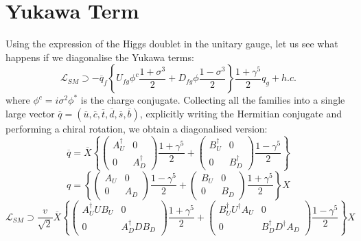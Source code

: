 \documentclass[11pt,a4paper,twoside,openright]{report}
\begin{document}
\section{Yukawa Term}
Using the expression of the Higgs doublet in the unitary gauge, let us see what happens if we diagonalise the Yukawa terms:
\begin{equation}
\mathcal{L}_{SM} \supset -\overline{q}_f \left\{ U_{fg}\phi^c\frac{1+\sigma^3}{2}+D_{fg}\phi\frac{1-\sigma^3}{2} \right\}\frac{1+\gamma^5}{2}q_g+h.c.
\end{equation}
where \(\phi^c=i\sigma^2\phi^*\) is the charge conjugate. Collecting all the families into a single large vector \(\overline{q}=(\overline{u},\overline{c},\overline{t},\overline{d},\overline{s},\overline{b})\), explicitly writing the Hermitian conjugate and performing a chiral rotation, we obtain a diagonalised version:
\begin{equation}
\overline{q}=\overline{X}\left\{ \begin{pmatrix} A_U^\dagger & 0 \\ 0 & A_D^\dagger \end{pmatrix} \frac{1+\gamma^5}{2} + \begin{pmatrix} B_U^\dagger & 0 \\ 0 & B_D^\dagger \end{pmatrix} \frac{1-\gamma^5}{2}  \right\}
\end{equation}
\begin{equation}
q=\left\{ \begin{pmatrix} A_U & 0 \\ 0 & A_D \end{pmatrix} \frac{1-\gamma^5}{2} + \begin{pmatrix} B_U & 0 \\ 0 & B_D \end{pmatrix} \frac{1+\gamma^5}{2}  \right\}X
\end{equation}
\begin{equation}
\mathcal{L}_{SM} \supset\frac{v}{\sqrt{2}}\overline{X} \left\{ \begin{pmatrix} A_U^\dagger UB_U & 0 \\ 0 & A_D^\dagger DB_D \end{pmatrix} \frac{1+\gamma^5}{2} + \begin{pmatrix} B_U^\dagger U^\dagger A_U & 0 \\ 0 & B_D^\dagger D^\dagger A_D \end{pmatrix} \frac{1-\gamma^5}{2}  \right\}X
\end{equation}
\end{document}

